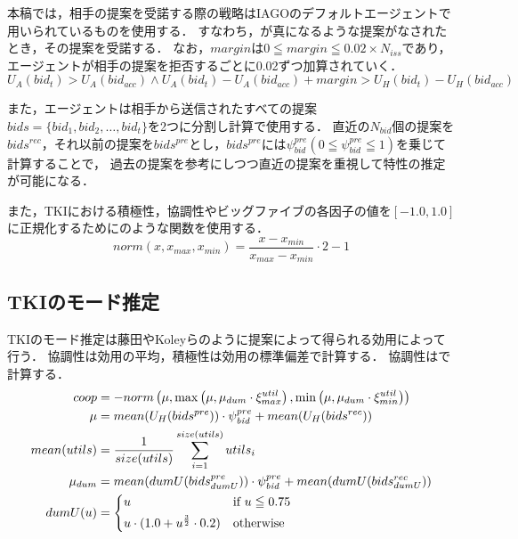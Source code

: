 本稿では，相手の提案を受諾する際の戦略はIAGOのデフォルトエージェントで用いられているものを使用する．
すなわち，が真になるような提案がなされたとき，その提案を受諾する．
なお，$margin$は$0 \leqq margin \leqq 0.02 \times N_{iss}$であり，エージェントが相手の提案を拒否するごとに0.02ずつ加算されていく．
\begin{equation}
    U_A(bid_t) > U_A(bid_{acc}) \wedge U_A(bid_t) - U_A(bid_{acc}) + margin > U_H(bid_t) - U_H(bid_{acc}) 
    \label{eq:acceptance}
\end{equation}

また，エージェントは相手から送信されたすべての提案$bids = \{ bid_1, bid_2, \ldots , bid_t \}$を2つに分割し計算で使用する．
直近の$N_{\mathit{bid}}$個の提案を$bids^{rec}$，それ以前の提案を$bids^{pre}$とし，$bids^{pre}$には$\psi_{\mathit{bid}}^{pre}(0 \leqq \psi_{\mathit{bid}}^{pre} \leqq 1)$を乗じて計算することで，
過去の提案を参考にしつつ直近の提案を重視して特性の推定が可能になる．

また，TKIにおける積極性，協調性やビッグファイブの各因子の値を$[-1.0, 1.0]$に正規化するためにのような関数を使用する．
\begin{equation}
    norm(x, x_{max}, x_{min}) = \frac{x - x_{min}}{x_{max} - x_{min}} \cdot 2 - 1
    \label{eq:normarize}
\end{equation}

\subsection{TKIのモード推定}
TKIのモード推定は藤田\cite{tki-aa}やKoleyら\cite{tki-ha}のように提案によって得られる効用によって行う．
協調性は効用の平均，積極性は効用の標準偏差で計算する．
協調性はで計算する．
\begin{align}
    coop &= -norm \left(\mu, \max \left( \mu, \mu_{dum} \cdot \xi_{max}^{util}\right) , \min \left( \mu, \mu_{dum} \cdot \xi_{min}^{util} \right) \right) \label{eq:cooperativeness} \\
    \mu &= mean(U_H(bids^{pre})) \cdot \psi_{\mathit{bid}}^{pre} + mean(U_H(bids^{rec})) \nonumber \\
    mean(utils) &= \frac{1}{size(utils)}\sum_{i = 1}^{size(utils)} utils_i \nonumber \\
    \mu_{dum} &= mean(dumU(bids_{dumU}^{pre})) \cdot \psi_{\mathit{bid}}^{pre} + mean(dumU(bids_{dumU}^{rec})) \nonumber \\
    dumU(u) &=
    \begin{cases*}
        u & if $u \leqq 0.75$ \\
        u \cdot (1.0 + u^{\frac{3}{2}} \cdot 0.2) & otherwise \\
    \end{cases*} \label{eq:dummyMean}
\end{align}


